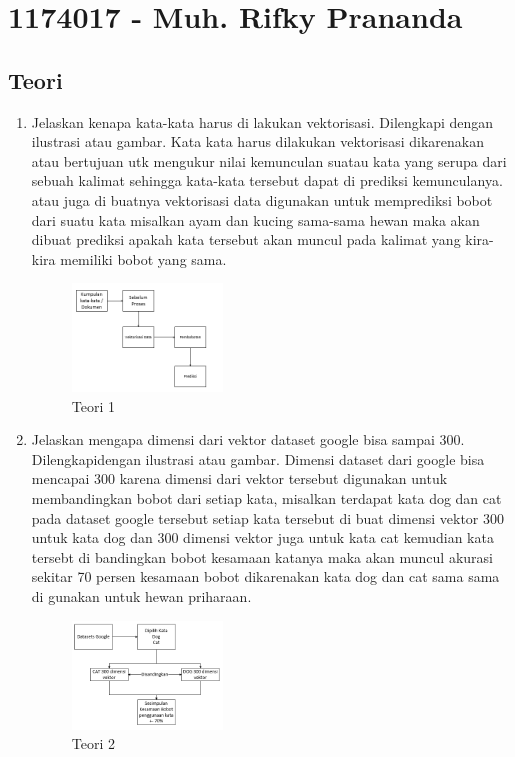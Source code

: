 \section{1174017 - Muh. Rifky Prananda}
\subsection{Teori}
\begin{enumerate}
	\item Jelaskan kenapa kata-kata harus di lakukan vektorisasi. Dilengkapi dengan ilustrasi atau gambar.
	\hfill\break
	Kata kata harus dilakukan vektorisasi dikarenakan atau bertujuan utk mengukur nilai kemunculan suatau kata yang serupa dari sebuah kalimat sehingga kata-kata tersebut dapat di prediksi kemunculanya. atau juga di buatnya vektorisasi data digunakan untuk memprediksi bobot dari suatu kata misalkan ayam dan kucing sama-sama hewan maka akan dibuat prediksi apakah kata tersebut akan muncul pada kalimat yang kira-kira memiliki bobot yang sama.
	\hfill\break
	\begin{figure}[H]
		\includegraphics[width=4cm]{figures/1174017/5/1.png}
		\centering
		\caption{Teori 1}
	\end{figure}

	\item Jelaskan mengapa dimensi dari vektor dataset google bisa sampai 300. Dilengkapidengan ilustrasi atau gambar.
	\hfill\break
	Dimensi dataset dari google bisa mencapai 300 karena dimensi dari vektor tersebut digunakan untuk membandingkan bobot dari setiap kata, misalkan terdapat kata dog dan cat pada dataset google tersebut setiap kata tersebut di buat dimensi vektor 300 untuk kata dog dan 300 dimensi vektor juga untuk kata cat kemudian kata tersebt di bandingkan bobot kesamaan katanya maka akan muncul akurasi sekitar 70 persen kesamaan bobot dikarenakan kata dog dan cat sama sama di gunakan untuk hewan priharaan.
	\hfill\break
	\begin{figure}[H]
		\includegraphics[width=4cm]{figures/1174017/5/2.png}
		\centering
		\caption{Teori 2}
	\end{figure}


\end{enumerate}
